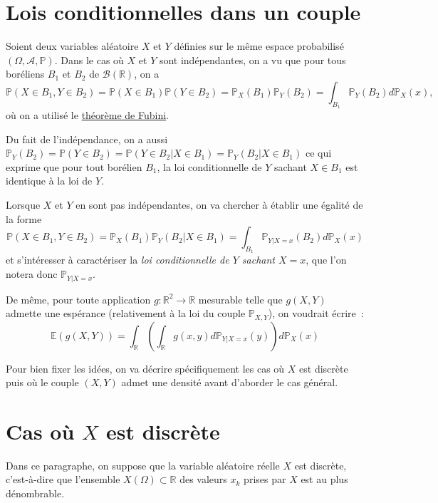 \section{Lois conditionnelles dans un
couple}\label{III-lois-conditionnelles-dans-un-couple}

Soient deux variables aléatoire \(X\) et \(Y\) définies sur le même
espace probabilisé \((\Omega, \mathcal{A}, \mathbb{P})\). Dans le cas où
\(X\) et \(Y\) sont indépendantes, on a vu que pour tous boréliens
\(B_1\) et \(B_2\) de \(\mathcal{B}(\mathbb{R})\), on a
\[\mathbb{P}(X\in B_1, Y\in B_2)= \mathbb{P}(X\in B_1)\mathbb{P}(Y\in B_2) = \mathbb{P}_X(B_1)\mathbb{P}_Y(B_2) = \int_{B_1}\mathbb{P}_Y(B_2)d\mathbb{P}_X(x),\]
où on a utilisé le
\href{Probabilité\%20II.pdf\%20\#fubiniproba}{théorème de Fubini}.

Du fait de l'indépendance, on a aussi
\(\mathbb{P}_Y(B_2) = \mathbb{P}(Y\in B_2) = \mathbb{P}(Y \in B_2 | X \in B_1) = \mathbb{P}_Y(B_2|X \in B_1)\)
ce qui exprime que pour tout borélien \(B_1\), la loi conditionnelle de
\(Y\) sachant \(X\in B_1\) est identique à la loi de \(Y\).

Lorsque \(X\) et \(Y\) en sont pas indépendantes, on va chercher à
établir une égalité de la forme
\[\mathbb{P}(X\in B_1, Y\in B_2) = \mathbb{P}_X(B_1)\mathbb{P}_Y(B_2 |X\in B_1) = \int_{B_1}\mathbb{P}_{Y|X=x}(B_2)d\mathbb{P}_X(x)\]
et s'intéresser à caractériser la \emph{loi conditionnelle de \(Y\)
sachant \(X=x\)}, que l'on notera donc \(\mathbb{P}_{Y|X=x}\).

De même, pour toute application \(g : \mathbb{R}^2 \to \mathbb{R}\)
mesurable telle que \(g(X,Y)\) admette une espérance (relativement à la
loi du couple \(\mathbb{P}_{X,Y}\)), on voudrait écrire~:
\[\mathbb{E}(g(X,Y)) = \int_{\mathbb{R}} \left( \int_{\mathbb{R}} g(x,y) d\mathbb{P}_{Y|X=x}(y)\right) d\mathbb{P}_X(x)\]

Pour bien fixer les idées, on va décrire spécifiquement les cas où \(X\)
est discrète puis où le couple \((X,Y)\) admet une densité avant
d'aborder le cas général.

\section{Cas où \(X\) est
discrète}\label{III-cas-ouxf9-x-est-discruxe8te}

Dans ce paragraphe, on suppose que la variable aléatoire réelle \(X\)
est discrète, c'est-à-dire que l'ensemble
\(X(\Omega) \subset \mathbb{R}\) des valeurs \(x_k\) prises par \(X\)
est au plus dénombrable.

